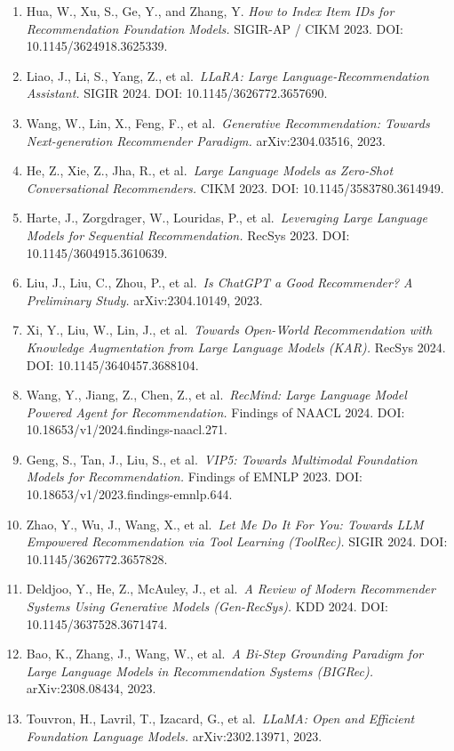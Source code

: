 \begin{enumerate}
\item
  Hua, W., Xu, S., Ge, Y., and Zhang, Y. \emph{How to Index Item IDs for Recommendation Foundation Models.} SIGIR-AP / CIKM 2023. DOI: 10.1145/3624918.3625339.
\item
  Liao, J., Li, S., Yang, Z., et al.~\emph{LLaRA: Large Language-Recommendation Assistant.} SIGIR 2024. DOI: 10.1145/3626772.3657690.
\item
  Wang, W., Lin, X., Feng, F., et al.~\emph{Generative Recommendation: Towards Next-generation Recommender Paradigm.} arXiv:2304.03516, 2023.
\item
  He, Z., Xie, Z., Jha, R., et al.~\emph{Large Language Models as Zero-Shot Conversational Recommenders.} CIKM 2023. DOI: 10.1145/3583780.3614949.
\item
  Harte, J., Zorgdrager, W., Louridas, P., et al.~\emph{Leveraging Large Language Models for Sequential Recommendation.} RecSys 2023. DOI: 10.1145/3604915.3610639.
\item
  Liu, J., Liu, C., Zhou, P., et al.~\emph{Is ChatGPT a Good Recommender? A Preliminary Study.} arXiv:2304.10149, 2023.
\item
  Xi, Y., Liu, W., Lin, J., et al.~\emph{Towards Open-World Recommendation with Knowledge Augmentation from Large Language Models (KAR).} RecSys 2024. DOI: 10.1145/3640457.3688104.
\item
  Wang, Y., Jiang, Z., Chen, Z., et al.~\emph{RecMind: Large Language Model Powered Agent for Recommendation.} Findings of NAACL 2024. DOI: 10.18653/v1/2024.findings-naacl.271.
\item
  Geng, S., Tan, J., Liu, S., et al.~\emph{VIP5: Towards Multimodal Foundation Models for Recommendation.} Findings of EMNLP 2023. DOI: 10.18653/v1/2023.findings-emnlp.644.
\item
  Zhao, Y., Wu, J., Wang, X., et al.~\emph{Let Me Do It For You: Towards LLM Empowered Recommendation via Tool Learning (ToolRec).} SIGIR 2024. DOI: 10.1145/3626772.3657828.
\item
  Deldjoo, Y., He, Z., McAuley, J., et al.~\emph{A Review of Modern Recommender Systems Using Generative Models (Gen-RecSys).} KDD 2024. DOI: 10.1145/3637528.3671474.
\item
  Bao, K., Zhang, J., Wang, W., et al.~\emph{A Bi-Step Grounding Paradigm for Large Language Models in Recommendation Systems (BIGRec).} arXiv:2308.08434, 2023.
\item
  Touvron, H., Lavril, T., Izacard, G., et al.~\emph{LLaMA: Open and Efficient Foundation Language Models.} arXiv:2302.13971, 2023.

\end{enumerate}
